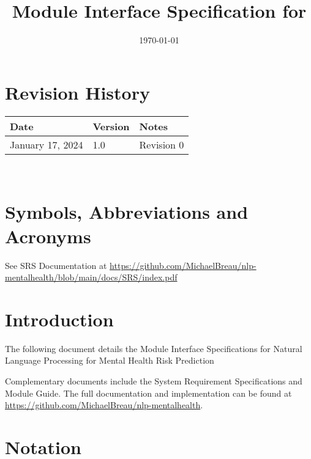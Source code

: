 \documentclass[12pt, titlepage]{article}
\begin{document}
\title{Module Interface Specification for \progname{}}

\author{\authname}

\date{\today}

\maketitle


\section{Revision History}

\begin{tabularx}{\textwidth}{p{3cm}p{2cm}X}
\toprule {\bf Date} & {\bf Version} & {\bf Notes}\\
\midrule
January 17, 2024 & 1.0 & Revision 0\\
\bottomrule
\end{tabularx}

~\newpage

\section{Symbols, Abbreviations and Acronyms}

See SRS Documentation at \url{https://github.com/MichaelBreau/nlp-mentalhealth/blob/main/docs/SRS/index.pdf}

\newpage

\tableofcontents

\newpage


\section{Introduction}

The following document details the Module Interface Specifications for
Natural Language Processing for Mental Health Risk Prediction 

Complementary documents include the System Requirement Specifications
and Module Guide.  The full documentation and implementation can be
found at \url{https://github.com/MichaelBreau/nlp-mentalhealth}.

\section{Notation}
\end{document}

